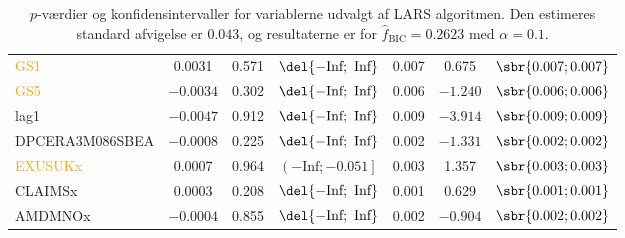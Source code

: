 \begin{table}[ht]
{\begin{tabular}{lcccccc}
 \textcolor{orange}{GS1}  &0.0031& 0.571 &      $\del{-\text{Inf}   ;  \text{ Inf} }$ &  0.007&   0.675&   $\sbr{0.007 ;  0.007}$     \\
 \textcolor{orange}{GS5}&$-0.0034$& 0.302&      $\del{-\text{Inf}   ;  \text{ Inf} }$&   0.006 &$ -1.240$ &   $\sbr{0.006;  0.006}$   \\
 \textcolor{blue3}{lag1} &$-0.0047$&  0.912   &  $\del{-\text{Inf}   ;  \text{ Inf} }$& 0.009& $ -3.914  $& $\sbr{0.009;   0.009 }$   \\
  \textcolor{red3}{DPCERA3M086SBEA}  &$-0.0008$& 0.225 &      $\del{-\text{Inf}   ;  \text{ Inf} }$ & 0.002&  $-1.331  $& $\sbr{0.002;   0.002 }$   \\
 \textcolor{orange}{EXUSUKx} &0.0007 & 0.964  &    $\left( -\text{Inf}   ;  -0.051\right] $& 0.003 &  1.357  &  $\sbr{0.003 ;  0.003}$   \\
 \textcolor{blue3}{CLAIMSx} &0.0003& 0.208   &   $\del{-\text{Inf}   ;  \text{ Inf} }$&  0.001  & 0.629  & $\sbr{ 0.001 ;  0.001 }$  \\
 \textcolor{red3}{AMDMNOx} &$-0.0004$ & 0.855     &  $\del{-\text{Inf}   ;  \text{ Inf} }$&  0.002&  $-0.904 $ &$\sbr{0.002 ;  0.002}$  \\ \bottomrule
\end{tabular}  
}
\caption{\(p\)-værdier og konfidensintervaller for variablerne udvalgt af LARS algoritmen. Den estimeres standard afvigelse er \(0.043\), og resultaterne er for \(\widehat{f}_{\text{BIC}} = 0.2623 \) med \(\alpha = 0.1\).} \label{tab:larInf_bic}
\end{table} 